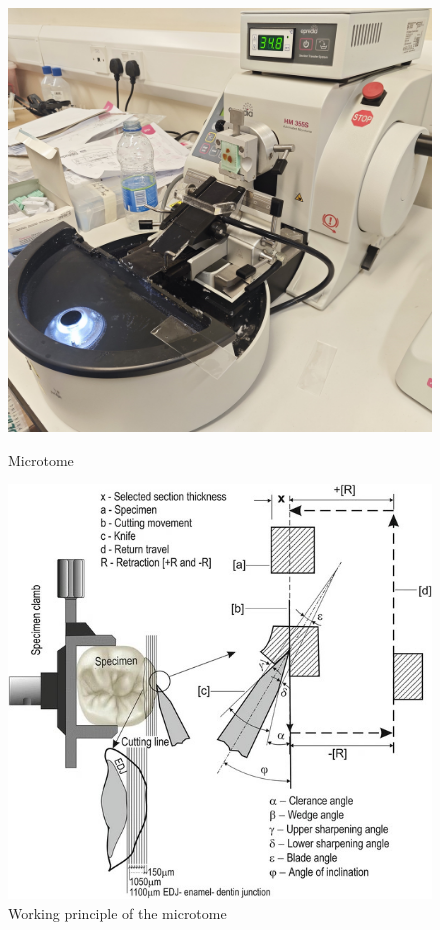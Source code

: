 \begin{figure}[htbp]
    \centering
    \begin{minipage}{0.35\textwidth}
        \centering
        \includegraphics[width=\textwidth]{./fig/machine.jpg}
        \caption{Microtome}
        \label{fig:machine}
    \end{minipage}
    \begin{minipage}{0.35\textwidth}
        \centering
        \includegraphics[width=\textwidth]{./fig/10266_2018_353_Fig1_HTML.jpg}
        \caption{Working principle of the microtome}
        \label{fig:cutting_machine}
    \end{minipage}
\end{figure}

